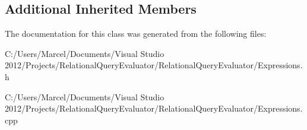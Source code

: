 \subsection*{Additional Inherited Members}


The documentation for this class was generated from the following files\+:\begin{DoxyCompactItemize}
\item 
C\+:/\+Users/\+Marcel/\+Documents/\+Visual Studio 2012/\+Projects/\+Relational\+Query\+Evaluator/\+Relational\+Query\+Evaluator/Expressions.\+h\item 
C\+:/\+Users/\+Marcel/\+Documents/\+Visual Studio 2012/\+Projects/\+Relational\+Query\+Evaluator/\+Relational\+Query\+Evaluator/Expressions.\+cpp\end{DoxyCompactItemize}
